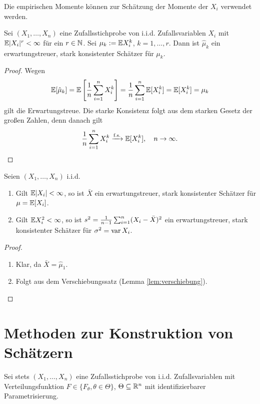 Die empirischen Momente können zur Schätzung der Momente der $X_i$ verwendet
werden.

\begin{thm}
  Sei $(X_1, \ldots, X_n)$ eine Zufallsstichprobe von i.i.d. Zufallsvariablen
  $X_i$ mit $\mathbb{E}|X_i|^r < \infty$ für ein $r \in \mathbb{N}$. Sei $\mu_k := \mathbb{E}
  X_i^k$, $k = 1, \ldots, r$. Dann ist $\hat{\mu}_k$ ein erwartungstreuer, stark
  konsistenter Schätzer für $\mu_k$.
\end{thm}

\begin{proof}
  Wegen
  \begin{align*}
    \mathbb{E}[\hat{\mu}_k] = \mathbb{E}\left[ \frac{1}{n} \sum_{i=1}^n X_i^k \right]
    = \frac{1}{n} \sum_{i=1}^n \mathbb{E}[X_i^k] = \mathbb{E}[X_i^k] = \mu_k
  \end{align*}
  gilt die Erwartungstreue. Die starke Konsistenz folgt aus dem starken Gesetz
  der großen Zahlen, denn danach gilt
  \[ \frac{1}{n} \sum_{i=1}^n X_i^k \xrightarrow{\text{f.s.}} \mathbb{E}[X_i^k], \quad n
    \to \infty. \qedhere \]
\end{proof}

\begin{kor}
  Seien $(X_1, \ldots, X_n)$ i.i.d.
  \begin{enumerate}
  \item Gilt $\mathbb{E}|X_i| < \infty$, so ist $\bar{X}$ ein erwartungstreuer, stark
    konsistenter Schätzer für $\mu = \mathbb{E}[X_i]$.
  \item Gilt $\mathbb{E} X_i^2 < \infty$, so ist $s^2 = \frac{1}{n-1} \sum_{i=1}^n (X_i -
    \bar{X})^2$ ein erwartungstreuer, stark konsistenter Schätzer für $\sigma^2
    = \operatorname{var} X_i$.
  \end{enumerate}
\end{kor}

\begin{proof}
  \begin{enumerate}
  \item Klar, da $\bar{X} = \hat{\mu}_1$.
  \item Folgt aus dem Verschiebungssatz (Lemma \ref{lem:verschiebung}). \qedhere
  \end{enumerate}
\end{proof}

\section{Methoden zur Konstruktion von Schätzern}
Sei stets $(X_1, \ldots, X_n)$ eine Zufallsstichprobe von i.i.d.
Zufallsvariablen mit Verteilungsfunktion $F \in \{ F_\theta, \theta \in \Theta
\}$, $\Theta \subseteq \mathbb{R}^n$ mit identifizierbarer Parametrisierung.

